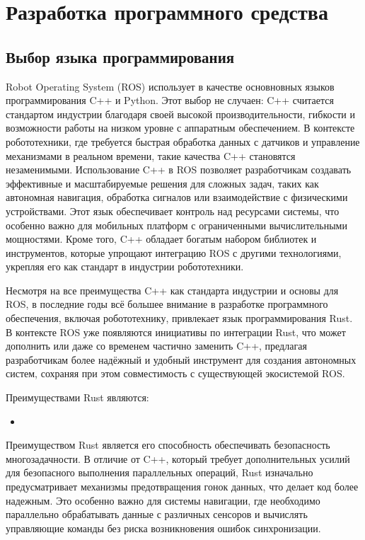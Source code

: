 \section{Разработка программного средства}

\subsection{Выбор языка программирования}
Robot Operating System (ROS) использует в качестве основновных языков
программирования C++ и Python. Этот выбор не случаен: C++ считается стандартом
индустрии благодаря своей высокой производительности, гибкости и возможности
работы на низком уровне с аппаратным обеспечением. В контексте робототехники,
где требуется быстрая обработка данных с датчиков и управление механизмами в
реальном времени, такие качества C++ становятся незаменимыми. Использование C++
в ROS позволяет разработчикам создавать эффективные и масштабируемые решения для
сложных задач, таких как автономная навигация, обработка сигналов или
взаимодействие с физическими устройствами. Этот язык обеспечивает 
контроль над ресурсами системы, что особенно важно для мобильных платформ с
ограниченными вычислительными мощностями. Кроме того, C++ обладает богатым
набором библиотек и инструментов, которые упрощают интеграцию ROS с другими
технологиями, укрепляя его как стандарт в индустрии робототехники.

Несмотря на все преимущества C++ как стандарта индустрии и основы для ROS, в
последние годы всё большее внимание в разработке программного обеспечения,
включая робототехнику, привлекает язык программирования Rust. В контексте ROS
уже появляются инициативы по интеграции Rust, что может дополнить или даже со
временем частично заменить C++, предлагая разработчикам более надёжный и удобный
инструмент для создания автономных систем, сохраняя при этом совместимость с
существующей экосистемой ROS.

Преимуществами Rust являются:

\begin{itemize}
	\item
\end{itemize}

Преимуществом Rust является его способность обеспечивать безопасность
многозадачности. В отличие от C++, который требует дополнительных усилий для
безопасного выполнения параллельных операций, Rust изначально предусматривает
механизмы предотвращения гонок данных, что делает код более надежным. Это
особенно важно для системы навигации, где необходимо параллельно обрабатывать
данные с различных сенсоров и вычислять управляющие команды без риска
возникновения ошибок синхронизации.

